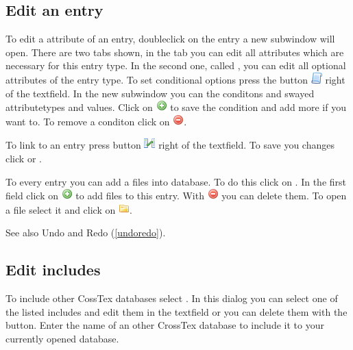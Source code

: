 \documentclass[a4paper,10pt]{scrartcl}
\begin{document}
\subsection{Edit an entry}\label{editentry}
To edit a attribute of an entry, doubleclick on the entry a new subwindow will
open. There are two tabs shown, in the tab \requiredfields you can edit all
attributes which are necessary for this entry type.
In the second one, called  \optionalfields, you can edit all optional
attributes of the entry type. To set conditional options press the button
\includegraphics{../../images/script.png} right of the textfield. In the new
subwindow you can the conditons and swayed attributetypes and values. Click
on \includegraphics{../../images/add.png} to save the condition and add more if
you want to. To remove a conditon click on
\includegraphics{../../images/delete.png}.

To link to an entry press button
\includegraphics{../../images/table_relationship.png} right of the textfield. To
save you changes click \ok or \apply.

To every entry you can add a files into database. To do this click on
\optionalfields. In the first field click on
\includegraphics{../../images/add.png} to add files to this entry. With
\includegraphics{../../images/delete.png} you can delete them. To open a file
select it and click on \includegraphics{../../images/folder.png}.

See also Undo and Redo (\ref{undoredo}).
\subsection{Edit includes}
To include other CossTex databases select \clickpath{\edit}{\IncludeText}. In
this dialog you can select one of the listed includes and edit them in the
\LabelText textfield or you can delete them with the \remove button. Enter the
name of an other CrossTex database to include it to your currently opened
database.
\end{document}
